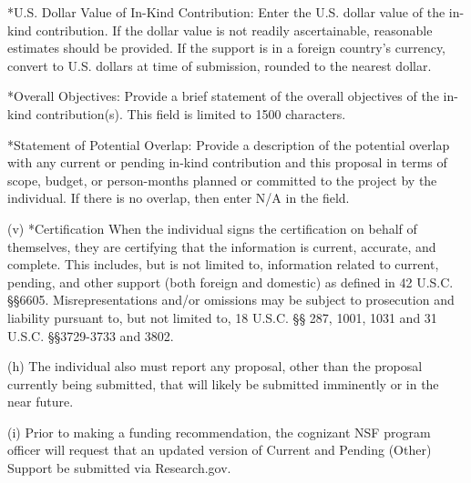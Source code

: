 {*U.S. Dollar Value of In-Kind Contribution: Enter the U.S. dollar value of the in-kind contribution. If the dollar value is not readily ascertainable, reasonable estimates should be provided. If the support is in a foreign country’s currency, convert to U.S. dollars at time of submission, rounded to the nearest dollar.

*Overall Objectives: Provide a brief statement of the overall objectives of the in-kind contribution(s). This field is limited to 1500 characters.

*Statement of Potential Overlap: Provide a description of the potential overlap with any current or pending in-kind contribution and this proposal in terms of scope, budget, or person-months planned or committed to the project by the individual. If there is no overlap, then enter N/A in the field.

(v) *Certification
When the individual signs the certification on behalf of themselves, they are certifying that the information is current, accurate, and complete. This includes, but is not limited to, information related to current, pending, and other support (both foreign and domestic) as defined in 42 U.S.C. §§6605. Misrepresentations and/or omissions may be subject to prosecution and liability pursuant to, but not limited to, 18 U.S.C. §§ 287, 1001, 1031 and 31 U.S.C. §§3729-3733 and 3802.

(h) The individual also must report any proposal, other than the proposal currently being submitted, that will likely be submitted imminently or in the near future.

(i) Prior to making a funding recommendation, the cognizant NSF program officer will request that an updated version of Current and Pending (Other) Support be submitted via Research.gov.
}
